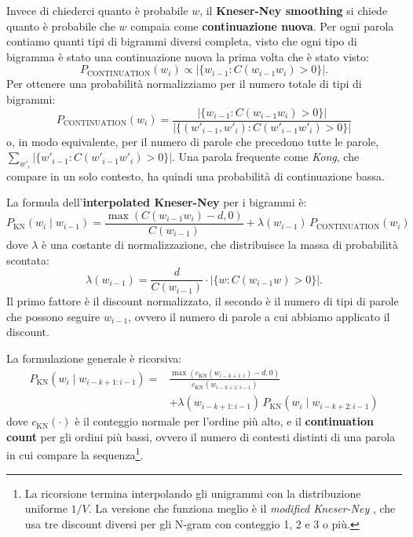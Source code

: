 Invece di chiederci quanto è probabile $w$, il \textbf{Kneser-Ney smoothing} \cite{kneser1995} si chiede quanto è probabile che $w$ compaia come \textbf{continuazione nuova}. Per ogni parola contiamo quanti tipi di bigrammi diversi completa, visto che ogni tipo di bigramma è stato una continuazione nuova la prima volta che è stato visto:
\begin{equation}
P_{\text{CONTINUATION}}(w_i) \propto \left|\{w_{i-1} : C(w_{i-1} w_i) > 0\}\right|.
\end{equation}
Per ottenere una probabilità normalizziamo per il numero totale di tipi di bigrammi:
\begin{equation}
P_{\text{CONTINUATION}}(w_i) = \frac{\left|\{w_{i-1} : C(w_{i-1} w_i) > 0\}\right|}{\left|\{(w'_{i-1}, w'_i) : C(w'_{i-1} w'_i) > 0\}\right|}
\end{equation}
o, in modo equivalente, per il numero di parole che precedono tutte le parole, $\sum_{w'_i} |\{w'_{i-1} : C(w'_{i-1} w'_i) > 0\}|$. Una parola frequente come \textit{Kong}, che compare in un solo contesto, ha quindi una probabilità di continuazione bassa.

La formula dell'\textbf{interpolated Kneser-Ney} per i bigrammi è:
\begin{equation}
P_{\text{KN}}(w_i \mid w_{i-1}) = \frac{\max(C(w_{i-1} w_i) - d, 0)}{C(w_{i-1})} + \lambda(w_{i-1})\, P_{\text{CONTINUATION}}(w_i)
\end{equation}
dove $\lambda$ è una costante di normalizzazione, che distribuisce la massa di probabilità scontata:
\begin{equation}
\lambda(w_{i-1}) = \frac{d}{C(w_{i-1})} \cdot \left|\{w : C(w_{i-1} w) > 0\}\right|.
\end{equation}
Il primo fattore è il discount normalizzato, il secondo è il numero di tipi di parole che possono seguire $w_{i-1}$, ovvero il numero di parole a cui abbiamo applicato il discount.

La formulazione generale è ricorsiva:
\begin{equation}
\begin{aligned}
P_{\text{KN}}(w_i \mid w_{i-k+1:i-1}) = {} & \frac{\max(c_{\text{KN}}(w_{i-k+1:i}) - d, 0)}{c_{\text{KN}}(w_{i-k+1:i-1})} \\
& + \lambda(w_{i-k+1:i-1})\, P_{\text{KN}}(w_i \mid w_{i-k+2:i-1})
\end{aligned}
\end{equation}
dove $c_{\text{KN}}(\cdot)$ è il conteggio normale per l'ordine più alto, e il \textbf{continuation count} per gli ordini più bassi, ovvero il numero di contesti distinti di una parola in cui compare la sequenza\footnote{La ricorsione termina interpolando gli unigrammi con la distribuzione uniforme $1/V$. La versione che funziona meglio è il \textit{modified Kneser-Ney} \cite{chen1998}, che usa tre discount diversi per gli N-gram con conteggio 1, 2 e 3 o più.}.

